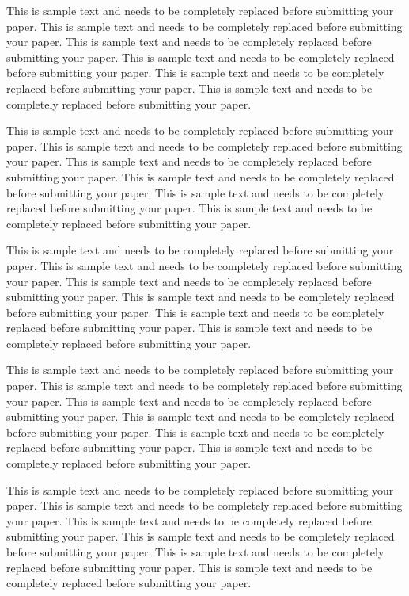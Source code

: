 \documentclass[11pt]{asaproc}
\begin{document}
This is sample text and needs to be completely replaced before submitting your paper. This is sample text and needs to be completely replaced before submitting your paper. This is sample text and needs to be completely replaced before submitting your paper. This is sample text and needs to be completely replaced before submitting your paper. This is sample text and needs to be completely replaced before submitting your paper. This is sample text and needs to be completely replaced before submitting your paper.

This is sample text and needs to be completely replaced before submitting your paper. This is sample text and needs to be completely replaced before submitting your paper. This is sample text and needs to be completely replaced before submitting your paper. This is sample text and needs to be completely replaced before submitting your paper. This is sample text and needs to be completely replaced before submitting your paper. This is sample text and needs to be completely replaced before submitting your paper.

This is sample text and needs to be completely replaced before submitting your paper. This is sample text and needs to be completely replaced before submitting your paper. This is sample text and needs to be completely replaced before submitting your paper. This is sample text and needs to be completely replaced before submitting your paper. This is sample text and needs to be completely replaced before submitting your paper. This is sample text and needs to be completely replaced before submitting your paper.

This is sample text and needs to be completely replaced before submitting your paper. This is sample text and needs to be completely replaced before submitting your paper. This is sample text and needs to be completely replaced before submitting your paper. This is sample text and needs to be completely replaced before submitting your paper. This is sample text and needs to be completely replaced before submitting your paper. This is sample text and needs to be completely replaced before submitting your paper.

This is sample text and needs to be completely replaced before submitting your paper. This is sample text and needs to be completely replaced before submitting your paper. This is sample text and needs to be completely replaced before submitting your paper. This is sample text and needs to be completely replaced before submitting your paper. This is sample text and needs to be completely replaced before submitting your paper. This is sample text and needs to be completely replaced before submitting your paper.
\end{document}
